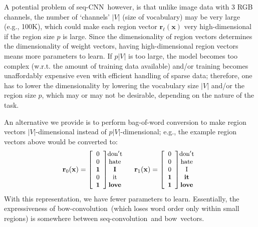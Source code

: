 \documentclass[11pt,letterpaper]{article}
\newcommand{\scnn}{seq-CNN}
\newcommand{\sconv}{seq-convolution}
\newcommand{\bconv}{bow-convolution}
\newcommand{\bow}{{bow}}
\newcommand{\bx}{{\mathbf x}}
\newcommand{\psz}{p}
\newcommand{\voc}{V}
\newcommand{\vsz}{|\voc|}
\newcommand{\region}{{\mathbf r}} \newcommand{\iL}{\ell} \newcommand{\nL}{L}
\newcommand{\bEqsz}{\begin{small}}
\newcommand{\eEqsz}{\end{small}}
\begin{document}
A potential problem of \scnn\, 
however, is that unlike image data with 3 RGB channels, 
the number of `channels' $\vsz$ (size of vocabulary) may be very 
large (e.g., 100K), which could make each region vector $\region_\iL(\bx)$ very high-dimensional 
if the region size $\psz$ is large.  
Since the dimensionality of region vectors determines the dimensionality of weight vectors, 
having high-dimensional region vectors means more parameters to learn.  If $\psz\vsz$ is too large, 
the model becomes too complex (w.r.t. the amount of training data available) and/or training 
becomes unaffordably expensive even with efficient handling of sparse data; 
therefore, one has to lower the dimensionality by lowering 
the vocabulary size $\vsz$ and/or the region size $\psz$, which may or may not be desirable, 
depending on the nature of the task.  

An alternative we provide is to perform bag-of-word conversion to make region vectors 
$\vsz$-dimensional instead of $\psz\vsz$-dimensional; 
e.g., the example region vectors above would be converted to: 
\vspace{-0.25in}
\[
\bEqsz
\region_0(\bx)=  \left[ 
  \begin{array}{c} 0 \cr 0 \cr{\bf 1}\cr 0 \cr{\bf 1} \end{array} 
\right]
\hspace{-0.1in}
  \begin{array}{c} {\rm don't}\cr{\rm hate}\cr{\rm \bf I}\cr{\rm it}\cr{\rm \bf love}\cr \end{array} 
~~~~                   
\region_1(\bx)=  \left[ 
  \begin{array}{c}  0 \cr 0 \cr 0 \cr{\bf 1}\cr{\bf 1} \cr \end{array} 
\right]
\hspace{-0.1in}
  \begin{array}{c} {\rm don't}\cr{\rm hate}\cr{\rm I}\cr{\rm \bf it}\cr{\rm \bf love}\cr \end{array}
\eEqsz
\]
With this representation, we have fewer parameters to learn.  
Essentially, the expressiveness of \bconv\ (which loses word order only within small regions) 
is somewhere between 
\sconv\ and \bow\ vectors. 
\end{document}
